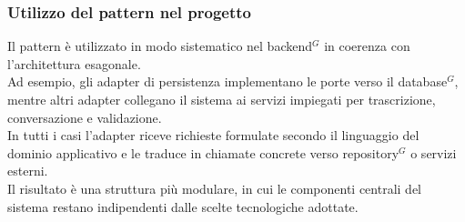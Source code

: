 \subsubsection{Utilizzo del pattern nel progetto}
Il pattern è utilizzato in modo sistematico nel backend$^G$ in coerenza con l'architettura esagonale.\\
Ad esempio, gli adapter di persistenza implementano le porte verso il database$^G$, mentre altri adapter collegano il sistema ai servizi impiegati per trascrizione, conversazione e validazione.\\
In tutti i casi l'adapter riceve richieste formulate secondo il linguaggio del dominio applicativo e le traduce in chiamate concrete verso repository$^G$ o servizi esterni.\\
Il risultato \`e una struttura pi\`u modulare, in cui le componenti centrali del sistema restano indipendenti dalle scelte tecnologiche adottate.